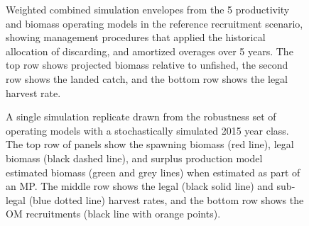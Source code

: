 \documentclass[11pt]{book}
\begin{document}
\begin{landscape}
\begin{figure}[htb]
{}

\caption{Weighted combined simulation envelopes from the 5 productivity and biomass operating models in the reference recruitment scenario, showing management procedures that applied the historical allocation of discarding, and amortized overages over 5 years. The top row shows projected biomass relative to unfished, the second row shows the landed catch, and the bottom row shows the legal harvest rate.}\label{fig:unnamed-chunk-21}
\end{figure}
\newpage
\begin{figure}[htb]

{\centering {} 

}

\caption{A single simulation replicate drawn from the robustness set of operating models with a stochastically simulated 2015 year class. The top row of panels show the spawning biomass (red line), legal biomass (black dashed line), and surplus production model estimated biomass (green and grey lines) when estimated as part of an MP. The middle row shows the legal (black solid line) and sub-legal (blue dotted line) harvest rates, and the bottom row shows the OM recruitments (black line with orange points).}\label{fig:unnamed-chunk-22}
\end{figure}
\newpage
\begin{figure}[htb]


\end{figure}
\end{landscape}
\end{document}
